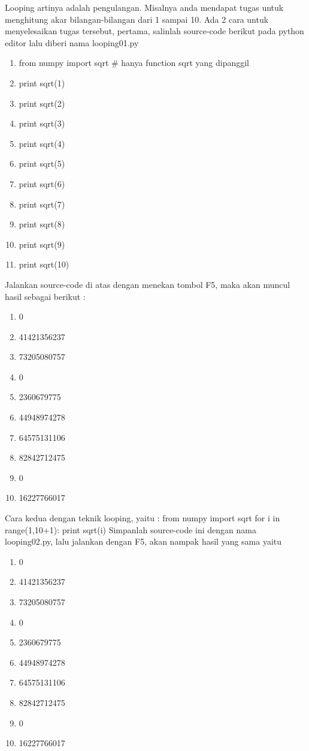 Looping artinya adalah pengulangan. Misalnya anda mendapat tugas untuk menghitung akar bilangan-bilangan dari 1 sampai 10. Ada 2 cara untuk menyelesaikan tugas tersebut, pertama, salinlah source-code berikut pada python editor lalu diberi nama looping01.py
\begin{enumerate}
\item from numpy import sqrt \# hanya function sqrt yang dipanggil
\item print sqrt(1)
\item print sqrt(2)
\item print sqrt(3)
\item print sqrt(4)
\item print sqrt(5)
\item print sqrt(6)
\item print sqrt(7)
\item print sqrt(8)
\item print sqrt(9)
\item print sqrt(10)
\end{enumerate}
Jalankan source-code di atas dengan menekan tombol F5, maka akan muncul hasil sebagai berikut :
\begin{enumerate}
\item 0
\item 41421356237
\item 73205080757
\item 0
\item 2360679775
\item 44948974278
\item 64575131106
\item 82842712475
\item 0
\item 16227766017
\end{enumerate}
Cara kedua dengan teknik looping, yaitu :
from numpy import sqrt
for i in range(1,10+1):
print sqrt(i)
Simpanlah source-code ini dengan nama looping02.py, lalu jalankan dengan F5, akan nampak
hasil yang sama yaitu
\begin{enumerate}
\item 0
\item 41421356237
\item 73205080757
\item 0
\item 2360679775
\item 44948974278
\item 64575131106
\item 82842712475
\item 0
\item 16227766017
\end{enumerate}

